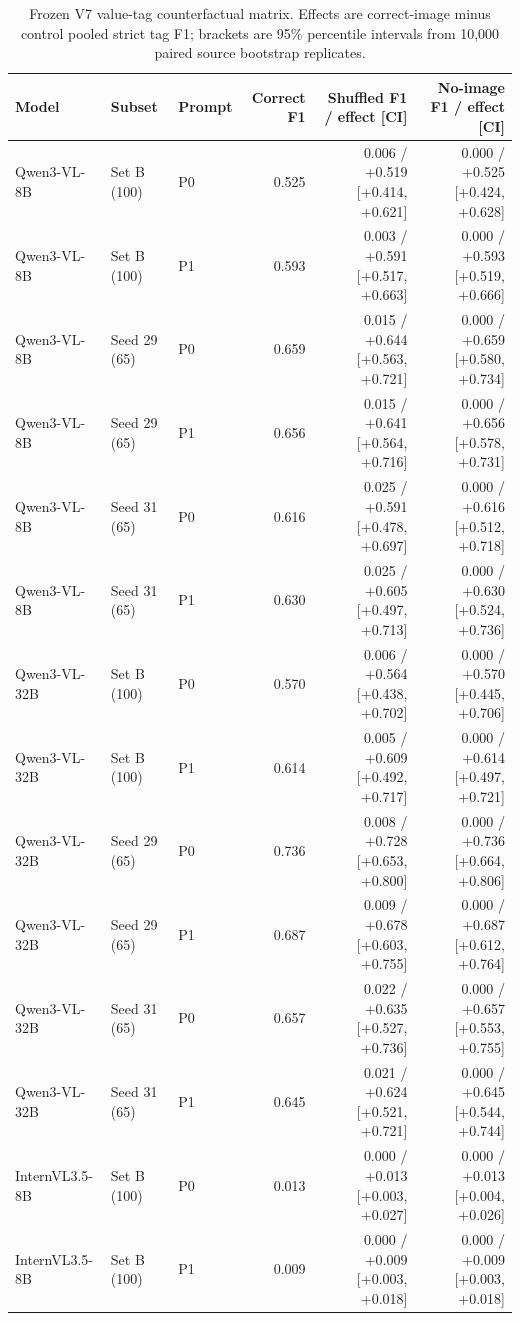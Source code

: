 \begin{table}[H]
\centering
\caption{Frozen V7 value-tag counterfactual matrix. Effects are correct-image minus control pooled strict tag F1; brackets are 95\% percentile intervals from 10,000 paired source bootstrap replicates.}
\label{tab:v7_counterfactual}
\scriptsize
\setlength{\tabcolsep}{3.2pt}
\begin{tabular}{lllrrr}
\toprule
Model & Subset & Prompt & Correct F1 & Shuffled F1 / effect [CI] & No-image F1 / effect [CI] \\
\midrule
Qwen3-VL-8B & Set B (100) & P0 & 0.525 & 0.006 / +0.519 [+0.414, +0.621] & 0.000 / +0.525 [+0.424, +0.628] \\
Qwen3-VL-8B & Set B (100) & P1 & 0.593 & 0.003 / +0.591 [+0.517, +0.663] & 0.000 / +0.593 [+0.519, +0.666] \\
Qwen3-VL-8B & Seed 29 (65) & P0 & 0.659 & 0.015 / +0.644 [+0.563, +0.721] & 0.000 / +0.659 [+0.580, +0.734] \\
Qwen3-VL-8B & Seed 29 (65) & P1 & 0.656 & 0.015 / +0.641 [+0.564, +0.716] & 0.000 / +0.656 [+0.578, +0.731] \\
Qwen3-VL-8B & Seed 31 (65) & P0 & 0.616 & 0.025 / +0.591 [+0.478, +0.697] & 0.000 / +0.616 [+0.512, +0.718] \\
Qwen3-VL-8B & Seed 31 (65) & P1 & 0.630 & 0.025 / +0.605 [+0.497, +0.713] & 0.000 / +0.630 [+0.524, +0.736] \\
\midrule
Qwen3-VL-32B & Set B (100) & P0 & 0.570 & 0.006 / +0.564 [+0.438, +0.702] & 0.000 / +0.570 [+0.445, +0.706] \\
Qwen3-VL-32B & Set B (100) & P1 & 0.614 & 0.005 / +0.609 [+0.492, +0.717] & 0.000 / +0.614 [+0.497, +0.721] \\
Qwen3-VL-32B & Seed 29 (65) & P0 & 0.736 & 0.008 / +0.728 [+0.653, +0.800] & 0.000 / +0.736 [+0.664, +0.806] \\
Qwen3-VL-32B & Seed 29 (65) & P1 & 0.687 & 0.009 / +0.678 [+0.603, +0.755] & 0.000 / +0.687 [+0.612, +0.764] \\
Qwen3-VL-32B & Seed 31 (65) & P0 & 0.657 & 0.022 / +0.635 [+0.527, +0.736] & 0.000 / +0.657 [+0.553, +0.755] \\
Qwen3-VL-32B & Seed 31 (65) & P1 & 0.645 & 0.021 / +0.624 [+0.521, +0.721] & 0.000 / +0.645 [+0.544, +0.744] \\
\midrule
InternVL3.5-8B & Set B (100) & P0 & 0.013 & 0.000 / +0.013 [+0.003, +0.027] & 0.000 / +0.013 [+0.004, +0.026] \\
InternVL3.5-8B & Set B (100) & P1 & 0.009 & 0.000 / +0.009 [+0.003, +0.018] & 0.000 / +0.009 [+0.003, +0.018] \\

\end{tabular}
\end{table}
